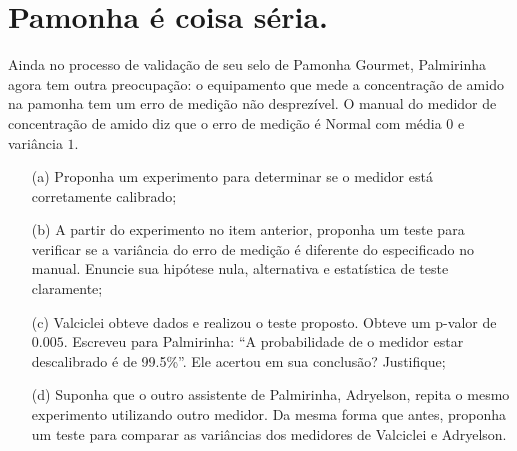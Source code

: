 \documentclass[a4paper,12pt, notitlepage]{report}
\begin{document}
\section{Pamonha é coisa séria.}

Ainda no processo de validação de seu selo de Pamonha Gourmet\textregistered, Palmirinha agora tem outra preocupação: o equipamento que mede a concentração de amido na pamonha tem um erro de medição não desprezível.
O manual do medidor de concentração de amido diz que o erro de medição é Normal com média $0$ e variância $1$.
\begin{itemize}
 \item[(a)] Proponha um experimento para determinar se o medidor está corretamente calibrado;
 \item[(b)] A partir do experimento no item anterior, proponha um teste para verificar se a variância do erro de medição é diferente do especificado no manual.
 Enuncie sua hipótese nula, alternativa e estatística de teste claramente;
  \item[(c)] Valciclei obteve dados e realizou o teste proposto. 
 Obteve um p-valor de $0.005$. 
 Escreveu para Palmirinha: ``A probabilidade de o medidor estar descalibrado é de 99.5\%''.
 Ele acertou em sua conclusão? Justifique;
 \item[(d)] Suponha que o outro assistente de Palmirinha, Adryelson, repita o mesmo experimento utilizando outro medidor.
 Da mesma forma que antes, proponha um teste para comparar as variâncias dos medidores de Valciclei e Adryelson.
\end{itemize}
 
\end{document}
